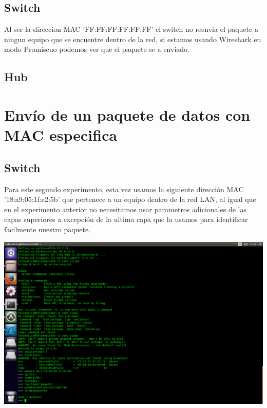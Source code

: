 \documentclass[spanish]{udpreport}
\begin{document}
\subsection{Switch}

Al ser la direccion MAC 'FF:FF:FF:FF:FF:FF' el switch no reenvia el paquete a ningun equipo que se encuentre dentro de la red, si estamos usando Wireshark en modo Promiscuo podemos ver que el paquete se a enviado.





\subsection{Hub}

\section{Envío de un paquete de datos con MAC especifica}
\subsection{Switch}

Para este segundo experimento, esta vez usamos la siguiente dirección MAC '18:a9:05:1f:e2:5b' que pertenece a un equipo dentro de la red LAN, al igual que en el experimento anterior no necesitamos usar parametros adicionales de las capas superiores a excepción de la ultima capa que la usamos para identificar facilmente nuestro paquete.

\begin{center}
	\includegraphics[scale=.37]{imagenes/Switch/Test_2.png}
\end{center}
\end{document}
